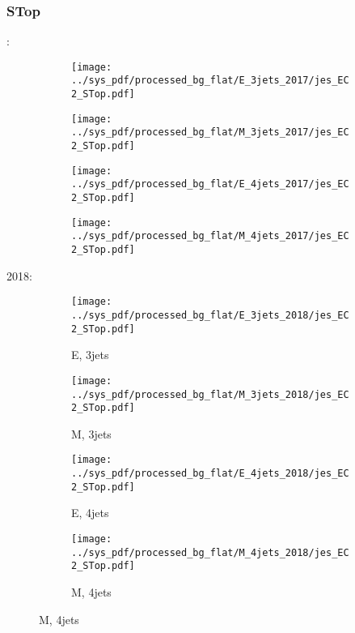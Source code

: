 \documentclass{beamer}
\begin{document}
\begin{frame}
\frametitle{STop}
\fontsize{5}{1}:
\begin{figure}
\centering
\begin{subfigure}[b]{0.24\textwidth}
\texttt{[image: ../sys\_pdf/processed\_bg\_flat/E\_3jets\_2017/jes\_EC2\_STop.pdf]}
\end{subfigure}
\begin{subfigure}[b]{0.24\textwidth}
\texttt{[image: ../sys\_pdf/processed\_bg\_flat/M\_3jets\_2017/jes\_EC2\_STop.pdf]}
\end{subfigure}
\begin{subfigure}[b]{0.24\textwidth}
\texttt{[image: ../sys\_pdf/processed\_bg\_flat/E\_4jets\_2017/jes\_EC2\_STop.pdf]}
\end{subfigure}
\begin{subfigure}[b]{0.24\textwidth}
\texttt{[image: ../sys\_pdf/processed\_bg\_flat/M\_4jets\_2017/jes\_EC2\_STop.pdf]}
\end{subfigure}
\end{figure}
2018:
\begin{figure}
\centering
\begin{subfigure}[b]{0.24\textwidth}
\texttt{[image: ../sys\_pdf/processed\_bg\_flat/E\_3jets\_2018/jes\_EC2\_STop.pdf]}
\captionsetup{font=tiny}
\caption{E, 3jets}
\end{subfigure}
\begin{subfigure}[b]{0.24\textwidth}
\texttt{[image: ../sys\_pdf/processed\_bg\_flat/M\_3jets\_2018/jes\_EC2\_STop.pdf]}
\captionsetup{font=tiny}
\caption{M, 3jets}
\end{subfigure}
\begin{subfigure}[b]{0.24\textwidth}
\texttt{[image: ../sys\_pdf/processed\_bg\_flat/E\_4jets\_2018/jes\_EC2\_STop.pdf]}
\captionsetup{font=tiny}
\caption{E, 4jets}
\end{subfigure}
\begin{subfigure}[b]{0.24\textwidth}
\texttt{[image: ../sys\_pdf/processed\_bg\_flat/M\_4jets\_2018/jes\_EC2\_STop.pdf]}
\captionsetup{font=tiny}
\caption{M, 4jets}
\end{subfigure}
\end{figure}
\end{frame}
\end{document}
